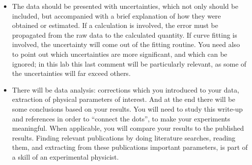\documentclass[11pt,a4paper]{article}
\begin{document}
\begin{itemize}
        Let us discuss this in a little more detail. There exists a notion of
        \emph{raw data}, the data you directly obtain in your measurement,
        directly read off the instruments. And then there is data which was to
        some degree analyzed and organized. For example, you may be measuring
        separate values of voltage $V$ and current $I$, and later you may be
        combining the two when obtaining resistance $R = V/I$. But your interest
        --- and the interest of the reader of your report --- is in that
        resistance $R$, and not in $V$ or $I$. Thus one should use common sense
        when reporting data: probably in this example, separate values of $V$
        and $I$ should not be reported (they can remain in your electronic data
        storage, to be examined if necessary), and $R$ should be reported.
        Likewise, if you are measuring a voltage signal which is being converted
        to a capacitance, do not report those voltages; report capacitance
        directly. You may however mention the range of the voltage signals
        that you measured in order to tell your reader something meaningful
        about the quality of your data.

  \item The data should be presented with uncertainties, which not only should
        be included, but accompanied with a brief explanation of how they were
        obtained or estimated. If a calculation is involved, the error must be
        propagated from the raw data to the calculated quantity. If curve
        fitting is involved, the uncertainty will come out of the fitting
        routine. You need also to point out which uncertainties are more
        significant, and which can be ignored; in this lab this last comment
        will be particularly relevant, as some of the uncertainties will far
        exceed others.

  \item There will be data analysis: corrections which you introduced to your
        data, extraction of physical parameters of interest. And at the end
        there will be some conclusions based on your results. You will need to
        study this write-up and references in order to ``connect the dots'', to
        make your experiments meaningful. When applicable, you will compare your
        results to the published results. Finding relevant publications by doing
        literature searches, reading them, and extracting from these
        publications important parameters, is part of a skill of an experimental
        physicist.
\end{itemize}
\end{document}
